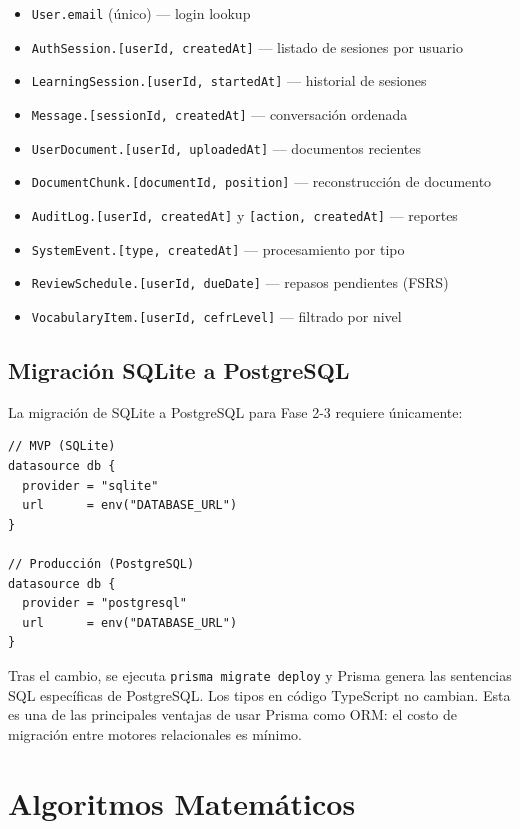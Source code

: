 \documentclass[10pt,a4paper,oneside]{report}
\begin{document}
\begin{itemize}[leftmargin=1.4em]
\item \texttt{User.email} (único) — login lookup
\item \texttt{AuthSession.[userId, createdAt]} — listado de sesiones por usuario
\item \texttt{LearningSession.[userId, startedAt]} — historial de sesiones
\item \texttt{Message.[sessionId, createdAt]} — conversación ordenada
\item \texttt{UserDocument.[userId, uploadedAt]} — documentos recientes
\item \texttt{DocumentChunk.[documentId, position]} — reconstrucción de documento
\item \texttt{AuditLog.[userId, createdAt]} y \texttt{[action, createdAt]} — reportes
\item \texttt{SystemEvent.[type, createdAt]} — procesamiento por tipo
\item \texttt{ReviewSchedule.[userId, dueDate]} — repasos pendientes (FSRS)
\item \texttt{VocabularyItem.[userId, cefrLevel]} — filtrado por nivel
\end{itemize}

\section{Migración SQLite a PostgreSQL}
La migración de SQLite a PostgreSQL para Fase 2-3 requiere únicamente:

\begin{lstlisting}[style=sql,caption={Cambio de provider en schema.prisma}]
// MVP (SQLite)
datasource db {
  provider = "sqlite"
  url      = env("DATABASE_URL")
}

// Producción (PostgreSQL)
datasource db {
  provider = "postgresql"
  url      = env("DATABASE_URL")
}
\end{lstlisting}

\vspace{4pt}
Tras el cambio, se ejecuta \texttt{prisma migrate deploy} y Prisma genera las sentencias SQL específicas de PostgreSQL. Los tipos en código TypeScript no cambian. Esta es una de las principales ventajas de usar Prisma como ORM: el costo de migración entre motores relacionales es mínimo.


\chapter{Algoritmos Matemáticos}
\end{document}
